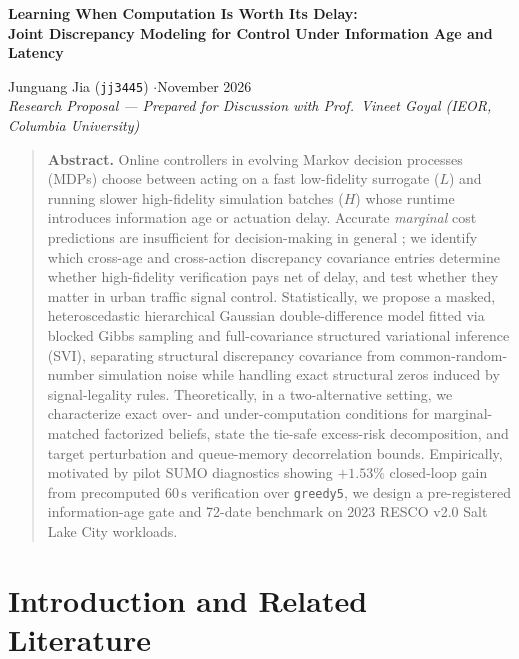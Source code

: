 \begin{center}
  {\Large\bfseries Learning When Computation Is Worth Its Delay:\\[2pt]
  Joint Discrepancy Modeling for Control Under Information Age and Latency\par}
  \vspace{4pt}
  {\normalsize Junguang Jia (\texttt{jj3445}) \quad$\cdot$\quad November 2026\\[2pt]
  \small\emph{Research Proposal --- Prepared for Discussion with Prof.\ Vineet Goyal (IEOR, Columbia University)}\par}
\end{center}

\vspace{-3pt}
\begin{quote}
\small\setlength{\parskip}{0pt}
\textbf{Abstract.}
Online controllers in evolving Markov decision processes (MDPs) choose between acting on a fast low-fidelity surrogate ($L$) and running slower high-fidelity simulation batches ($H$) whose runtime introduces information age or actuation delay. Accurate \emph{marginal} cost predictions are insufficient for decision-making in general \citep{wen2021predictions}; we identify which cross-age and cross-action discrepancy covariance entries determine whether high-fidelity verification pays net of delay, and test whether they matter in urban traffic signal control. Statistically, we propose a masked, heteroscedastic hierarchical Gaussian double-difference model fitted via blocked Gibbs sampling and full-covariance structured variational inference (SVI), separating structural discrepancy covariance from common-random-number simulation noise while handling exact structural zeros induced by signal-legality rules. Theoretically, in a two-alternative setting, we characterize exact over- and under-computation conditions for marginal-matched factorized beliefs, state the tie-safe excess-risk decomposition, and target perturbation and queue-memory decorrelation bounds. Empirically, motivated by pilot SUMO diagnostics showing $+1.53\%$ closed-loop gain from precomputed $60\,\mathrm{s}$ verification over \texttt{greedy5}, we design a pre-registered information-age gate and 72-date benchmark on 2023 RESCO v2.0 Salt Lake City workloads.
\end{quote}

\section{Introduction and Related Literature}

